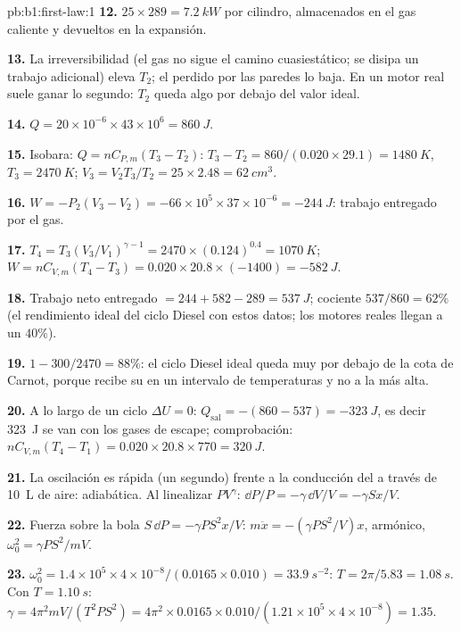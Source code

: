 \begin{solution}{pb:b1:first-law:1}
\textbf{12.} $25 \times 289 = \qty{7.2}{kW}$ por cilindro, almacenados en el gas
caliente y devueltos en la expansión.

\textbf{13.} La irreversibilidad (el gas no sigue el camino cuasiestático;
se disipa un trabajo adicional) eleva $T_2$; el  perdido por las
paredes lo baja. En un motor real suele ganar lo segundo: $T_2$ queda algo
por debajo del valor ideal.

\textbf{14.} $Q = 20\times10^{-6} \times 43\times10^6 = \qty{860}{J}$.

\textbf{15.} Isobara: $Q = nC_{P,m}(T_3 - T_2)$: $T_3 - T_2 = 860/(0.020 \times
29.1) = \qty{1480}{K}$, $T_3 = \qty{2470}{K}$; $V_3 = V_2T_3/T_2 = 25 \times
2.48 = \qty{62}{cm^3}$.

\textbf{16.} $W = -P_2(V_3 - V_2) = -66\times10^5 \times 37\times10^{-6} =
\qty{-244}{J}$: trabajo entregado por el gas.

\textbf{17.} $T_4 = T_3(V_3/V_1)^{\gamma - 1} = 2470 \times (0.124)^{0.4} =
\qty{1070}{K}$; $W = nC_{V,m}(T_4 - T_3) = 0.020 \times 20.8 \times (-1400) =
\qty{-582}{J}$.

\textbf{18.} Trabajo neto entregado $= 244 + 582 - 289 = \qty{537}{J}$; cociente
$537/860 = 62\%$ (el rendimiento ideal del ciclo Diesel con estos datos;
los motores reales llegan a un $40\%$).

\textbf{19.} $1 - 300/2470 = 88\%$: el ciclo Diesel ideal queda muy por
debajo de la cota de Carnot, porque recibe su  en un intervalo de
temperaturas y no a la más alta.

\textbf{20.} A lo largo de un ciclo $\Delta U = 0$: $Q_{\text{sal}} = -(860 - 537) =
\qty{-323}{J}$, es decir \qty{323}{J} se van con los gases de escape; comprobación:
$nC_{V,m}(T_4 - T_1) = 0.020 \times 20.8 \times 770 = \qty{320}{J}$.

\textbf{21.} La oscilación es rápida (un segundo) frente a la conducción
del  a través de \qty{10}{L} de aire: adiabática. Al linealizar
$PV^\gamma$: $\dd P/P = -\gamma\,\dd V/V = -\gamma Sx/V$.

\textbf{22.} Fuerza sobre la bola $S\,\dd P = -\gamma PS^2x/V$: $m\ddot x =
-(\gamma PS^2/V)x$, armónico, $\omega_0^2 = \gamma PS^2/mV$.

\textbf{23.} $\omega_0^2 = 1.4 \times 10^5 \times 4\times10^{-8}/(0.0165 \times 0.010)
= \qty{33.9}{s^{-2}}$: $T = 2\pi/5.83 = \qty{1.08}{s}$. Con $T = \qty{1.10}{s}$:
$\gamma = 4\pi^2mV/(T^2PS^2) = 4\pi^2 \times 0.0165 \times 0.010/(1.21 \times 10^5
\times 4\times10^{-8}) = 1.35$.


\end{solution}
